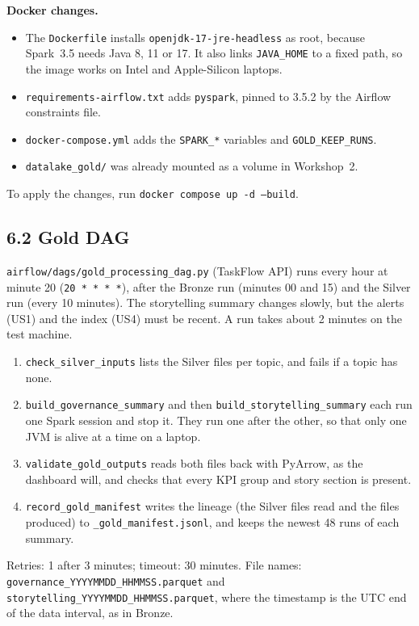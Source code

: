 \documentclass[stu, 12pt, letterpaper, donotrepeattitle, floatsintext, natbib]{apa7}
\begin{document}
\noindent \textbf{Docker changes.}
\begin{itemize}
    \item The \texttt{Dockerfile} installs \texttt{openjdk-17-jre-headless} as root, because Spark~3.5 needs Java 8, 11 or 17. It also links \texttt{JAVA\_HOME} to a fixed path, so the image works on Intel and Apple-Silicon laptops.
    \item \texttt{requirements-airflow.txt} adds \texttt{pyspark}, pinned to 3.5.2 by the Airflow constraints file.
    \item \texttt{docker-compose.yml} adds the \texttt{SPARK\_*} variables and \texttt{GOLD\_KEEP\_RUNS}.
    \item \texttt{datalake\_gold/} was already mounted as a volume in Workshop~2.
\end{itemize}
To apply the changes, run \texttt{docker compose up -d --build}.

\subsection{6.2 Gold DAG}
\texttt{airflow/dags/gold\_processing\_dag.py} (TaskFlow API) runs every hour at minute 20 (\texttt{20 * * * *}), after the Bronze run (minutes 00 and 15) and the Silver run (every 10 minutes). The storytelling summary changes slowly, but the alerts (US1) and the index (US4) must be recent. A run takes about 2 minutes on the test machine.
\begin{enumerate}
    \item \texttt{check\_silver\_inputs} lists the Silver files per topic, and fails if a topic has none.
    \item \texttt{build\_governance\_summary} and then \texttt{build\_storytelling\_summary} each run one Spark session and stop it. They run one after the other, so that only one JVM is alive at a time on a laptop.
    \item \texttt{validate\_gold\_outputs} reads both files back with PyArrow, as the dashboard will, and checks that every KPI group and story section is present.
    \item \texttt{record\_gold\_manifest} writes the lineage (the Silver files read and the files produced) to \texttt{\_gold\_manifest.jsonl}, and keeps the newest 48 runs of each summary.
\end{enumerate}
Retries: 1 after 3 minutes; timeout: 30 minutes. File names: \texttt{governance\_YYYYMMDD\_HHMMSS.parquet} and \texttt{storytelling\_YYYYMMDD\_HHMMSS.parquet}, where the timestamp is the UTC end of the data interval, as in Bronze.
\end{document}
